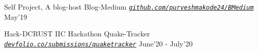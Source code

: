 
\begin{cventries}

  

  \cventry
  {Self Project, A blog-host}
  {Blog-Medium}
   {\emph{\texttt{\href{https://github.com/purveshmakode24/BMedium}{github.com/purveshmakode24/BMedium}}}}
  {May'19}
  {
    \begin{cvitems}
        \vspace{1mm}
    \end{cvitems}
  } 
  
  \vspace{0.5mm} %
  
  \cventry
  {Hack-DCRUST IIC Hackathon}
  {Quake-Tracker}
   {\emph{\texttt{\href{https://devfolio.co/submissions/quaketracker}{devfolio.co/submissions/quaketracker}}}}
  {June'20 - July'20}
  {
    \begin{cvitems}
        \vspace{1mm}
    \end{cvitems}
  }
  

\end{cventries}
